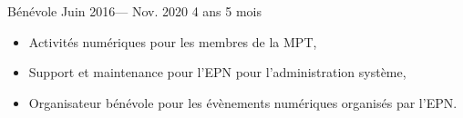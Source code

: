 \volunteerposition%
{Bénévole}%
{Juin 2016--- Nov. 2020}%
{4 ans 5 mois}%
{
	\begin{itemize}
	  \item Activités numériques pour les membres de la MPT,
    \item Support et maintenance pour l’EPN pour l’administration système,
    \item Organisateur bénévole pour les évènements numériques organisés par l’EPN.
	\end{itemize}
}
